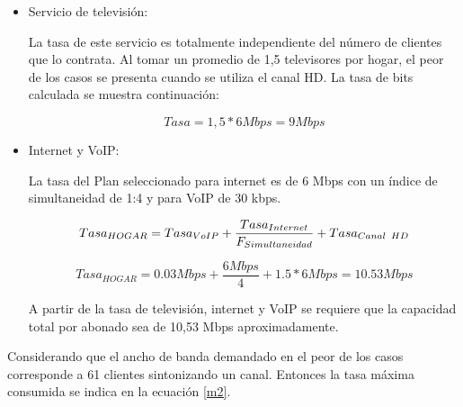 \begin{itemize}
\item Servicio de televisión:

La tasa de este servicio es totalmente independiente del número de clientes que lo contrata. Al tomar un promedio de 1,5 televisores por hogar, el peor de los casos se presenta cuando se utiliza el canal HD. La tasa de bits calculada se muestra continuación:

\begin{equation}
Tasa=1,5 * 6Mbps= 9Mbps
\end{equation}

\item Internet y VoIP:

La tasa del Plan seleccionado para internet es de 6 Mbps con un índice de simultaneidad de 1:4 y para VoIP de 30 kbps.

\begin{equation}
Tasa_{HOGAR}=Tasa_{VoIP}+\dfrac{Tasa_{Internet}}{F_{Simultaneidad}} +Tasa_{Canal\hspace{0.15cm}HD}
\end{equation}

\begin{equation}
Tasa_{HOGAR}=0.03 Mbps + \dfrac{6Mbps}{4}+ 1.5*6 Mbps=10.53Mbps
\label{m3}
\end{equation}

A partir de la tasa de televisión, internet y VoIP se requiere que la capacidad total por abonado sea de 10,53 Mbps aproximadamente.
\end{itemize}

Considerando que el ancho de banda demandado en el peor de los casos corresponde a 61 clientes sintonizando un canal. Entonces la tasa máxima consumida se indica en la ecuación \ref{m2}.